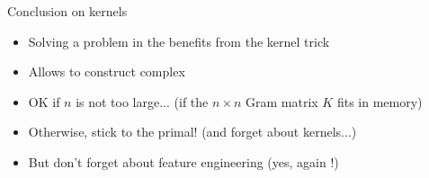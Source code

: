 \documentclass[xcolor={usenames,dvipsnames}]{beamer}
\begin{document}
\begin{frame}{Conclusion on kernels}

  \begin{itemize}
    \item Solving a problem in the  benefits from the kernel trick
    \pause
    \item Allows to construct complex 
    \pause 
    \item OK if $n$ is not too large... (if the $n \times n$ Gram matrix $K$ fits in memory)
    \item Otherwise, stick to the primal! (and forget about kernels...)
    \item But don't forget about feature engineering (yes, again !)
  \end{itemize}
 \end{frame}
  
  
%
%  
%  
  



\end{document}
